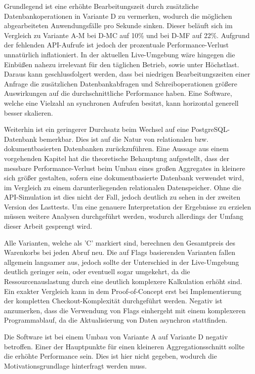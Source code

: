 Grundlegend ist eine erhöhte Bearbeitungszeit durch zusätzliche Datenbankoperationen in Variante D zu vermerken, wodurch die möglichen abgearbeiteten Anwendungsfälle pro Sekunde sinken.  Dieser beläuft sich im Vergleich zu Variante A-M bei D-MC auf 10\% und bei D-MF auf 22\%. Aufgrund der fehlenden API-Aufrufe ist jedoch der prozentuale Performance-Verlust unnatürlich inflationiert. In der aktuellen Live-Umgebung wäre hingegen die Einbüßen nahezu irrelevant für den täglichen Betrieb, sowie unter Höchstlast. Daraus kann geschlussfolgert werden, dass bei niedrigen Bearbeitungszeiten einer Anfrage die zusätzlichen Datenbankabfragen und Schreiboperationen größere Auswirkungen auf die durchschnittliche Performance haben. Eine Software, welche eine Vielzahl an synchronen Aufrufen besitzt, kann horizontal generell besser skalieren.

Weiterhin ist ein geringerer Durchsatz beim Wechsel auf eine PostgreSQL-Datenbank bemerkbar. Dies ist auf die Natur von relationalen bzw. dokumentbasierten Datenbanken zurückzuführen. Eine Aussage aus einem vorgehenden Kapitel hat die theoretische Behauptung aufgestellt, dass der messbare Performance-Verlust beim Umbau eines großen Aggregates in kleinere sich größer gestalten, sofern eine dokumentbasierte Datenbank verwendet wird, im Vergleich zu einem darunterliegenden relationalen Datenspeicher. Ohne die API-Simulation ist dies nicht der Fall, jedoch deutlich zu sehen in der zweiten Version des Lasttests. Um eine genauere Interpretation der Ergebnisse zu erzielen müssen weitere Analysen durchgeführt werden, wodurch allerdings der Umfang dieser Arbeit gesprengt wird.

Alle Varianten, welche als 'C' markiert sind, berechnen den Gesamtpreis des Warenkorbs bei jeden Abruf neu. Die auf Flags basierenden Varianten fallen allgemein langsamer aus, jedoch sollte der Unterschied in der Live-Umgebung deutlich geringer sein, oder eventuell sogar umgekehrt, da die Ressourcenauslastung durch eine deutlich komplexere Kalkulation erhöht sind. Ein exakter Vergleich kann in dem Proof-of-Concept erst bei Implementierung der kompletten Checkout-Komplexität durchgeführt werden. Negativ ist anzumerken, dass die Verwendung von Flags einhergeht mit einem komplexeren Programmablauf, da die Aktualisierung von Daten asynchron stattfinden.

Die Software ist bei einem Umbau von Variante A auf Variante D negativ betroffen. Einer der Hauptpunkte für einen kleineren Aggregationsschnitt sollte die erhöhte Performance sein. Dies ist hier nicht gegeben, wodurch die Motivationsgrundlage hinterfragt werden muss. 


